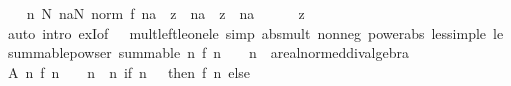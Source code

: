 \begin{isabellebody}
\ \ \isamarkupfalse%
\ {\isachardoublequoteopen}{\isasymAnd}n{\isachardot}{\kern0pt}\ {\isasymexists}N{\isachardot}{\kern0pt}\ {\isasymforall}na{\isasymge}N{\isachardot}{\kern0pt}\ norm\ {\isacharparenleft}{\kern0pt}f\ na\ {\isacharasterisk}{\kern0pt}\ z\ {\isacharcircum}{\kern0pt}\ na{\isacharparenright}{\kern0pt}\ {\isasymle}\ z\ {\isacharcircum}{\kern0pt}\ na{\isachardoublequoteclose}\isanewline
\ \ \ \ \isamarkupfalse%
\ z\isanewline
\ \ \ \ \isamarkupfalse%
\ {\isacharparenleft}{\kern0pt}auto\ intro{\isacharbang}{\kern0pt}{\isacharcolon}{\kern0pt}\ exI{\isacharbrackleft}{\kern0pt}of\ {\isacharunderscore}{\kern0pt}\ {}{\isacharbrackright}{\kern0pt}\ mult{\isacharunderscore}{\kern0pt}left{\isacharunderscore}{\kern0pt}le{\isacharunderscore}{\kern0pt}one{\isacharunderscore}{\kern0pt}le\ simp{\isacharcolon}{\kern0pt}\ abs{\isacharunderscore}{\kern0pt}mult\ nonneg\ power{\isacharunderscore}{\kern0pt}abs\ less{\isacharunderscore}{\kern0pt}imp{\isacharunderscore}{\kern0pt}le\ le{\isacharunderscore}{\kern0pt}{}{\isacharparenright}{\kern0pt}\isanewline
{}\isamarkupfalse%
%
\endisatagproof
{\isafoldproof}%
%
\isadelimproof
\isanewline
%
\endisadelimproof
\isanewline
{}\isamarkupfalse%
\ summable{\isacharunderscore}{\kern0pt}{}{\isacharunderscore}{\kern0pt}powser{\isacharcolon}{\kern0pt}\ {\isachardoublequoteopen}summable\ {\isacharparenleft}{\kern0pt}{\isasymlambda}n{\isachardot}{\kern0pt}\ f\ n\ {\isacharasterisk}{\kern0pt}\ {}\ {\isacharcircum}{\kern0pt}\ n\ {\isacharcolon}{\kern0pt}{\isacharcolon}{\kern0pt}\ {\isacharprime}{\kern0pt}a{\isacharcolon}{\kern0pt}{\isacharcolon}{\kern0pt}real{\isacharunderscore}{\kern0pt}normed{\isacharunderscore}{\kern0pt}div{\isacharunderscore}{\kern0pt}algebra{\isacharparenright}{\kern0pt}{\isachardoublequoteclose}\isanewline
%
\isadelimproof
%
\endisadelimproof
%
\isatagproof
{}\isamarkupfalse%
\ {\isacharminus}{\kern0pt}\isanewline
\ \ \isamarkupfalse%
\ A{\isacharcolon}{\kern0pt}\ {\isachardoublequoteopen}{\isacharparenleft}{\kern0pt}{\isasymlambda}n{\isachardot}{\kern0pt}\ f\ n\ {\isacharasterisk}{\kern0pt}\ {}\ {\isacharcircum}{\kern0pt}\ n{\isacharparenright}{\kern0pt}\ {\isacharequal}{\kern0pt}\ {\isacharparenleft}{\kern0pt}{\isasymlambda}n{\isachardot}{\kern0pt}\ if\ n\ {\isacharequal}{\kern0pt}\ {}\ then\ f\ n\ else\ {}{\isacharparenright}{\kern0pt}{\isachardoublequoteclose}\isanewline
\ \ \ \ \isamarkupfalse%

\end{isabellebody}

